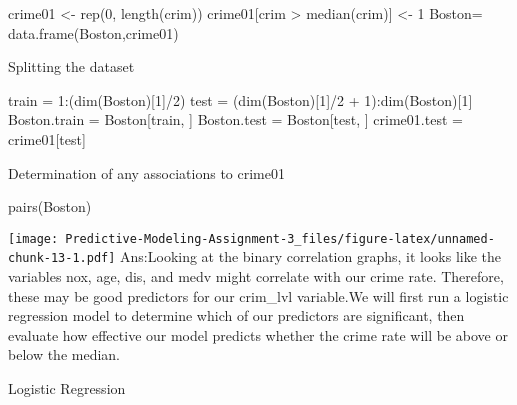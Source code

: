 \documentclass[
]{article}
\newenvironment{Shaded}{\begin{snugshade}}{\end{snugshade}}
\newcommand{\DecValTok}[1]{\textcolor[rgb]{0.00,0.00,0.81}{#1}}
\newcommand{\FunctionTok}[1]{\textcolor[rgb]{0.00,0.00,0.00}{#1}}
\newcommand{\NormalTok}[1]{#1}
\newcommand{\OtherTok}[1]{\textcolor[rgb]{0.56,0.35,0.01}{#1}}
\newcommand{\SpecialCharTok}[1]{\textcolor[rgb]{0.00,0.00,0.00}{#1}}
\begin{document}
\begin{Shaded}
\begin{Highlighting}[]
\NormalTok{crime01 }\OtherTok{\textless{}{-}} \FunctionTok{rep}\NormalTok{(}\DecValTok{0}\NormalTok{, }\FunctionTok{length}\NormalTok{(crim))}
\NormalTok{crime01[crim }\SpecialCharTok{\textgreater{}} \FunctionTok{median}\NormalTok{(crim)] }\OtherTok{\textless{}{-}} \DecValTok{1}
\NormalTok{Boston}\OtherTok{=} \FunctionTok{data.frame}\NormalTok{(Boston,crime01)}
\end{Highlighting}
\end{Shaded}

Splitting the dataset

\begin{Shaded}
\begin{Highlighting}[]
\NormalTok{train }\OtherTok{=} \DecValTok{1}\SpecialCharTok{:}\NormalTok{(}\FunctionTok{dim}\NormalTok{(Boston)[}\DecValTok{1}\NormalTok{]}\SpecialCharTok{/}\DecValTok{2}\NormalTok{)}
\NormalTok{test }\OtherTok{=}\NormalTok{ (}\FunctionTok{dim}\NormalTok{(Boston)[}\DecValTok{1}\NormalTok{]}\SpecialCharTok{/}\DecValTok{2} \SpecialCharTok{+} \DecValTok{1}\NormalTok{)}\SpecialCharTok{:}\FunctionTok{dim}\NormalTok{(Boston)[}\DecValTok{1}\NormalTok{]}
\NormalTok{Boston.train }\OtherTok{=}\NormalTok{ Boston[train, ]}
\NormalTok{Boston.test }\OtherTok{=}\NormalTok{ Boston[test, ]}
\NormalTok{crime01.test }\OtherTok{=}\NormalTok{ crime01[test]}
\end{Highlighting}
\end{Shaded}

Determination of any associations to crime01

\begin{Shaded}
\begin{Highlighting}[]
\FunctionTok{pairs}\NormalTok{(Boston)}
\end{Highlighting}
\end{Shaded}

\texttt{[image: Predictive-Modeling-Assignment-3\_files/figure-latex/unnamed-chunk-13-1.pdf]}
Ans:Looking at the binary correlation graphs, it looks like the
variables nox, age, dis, and medv might correlate with our crime rate.
Therefore, these may be good predictors for our crim\_lvl variable.We
will first run a logistic regression model to determine which of our
predictors are significant, then evaluate how effective our model
predicts whether the crime rate will be above or below the median.

Logistic Regression
\end{document}
